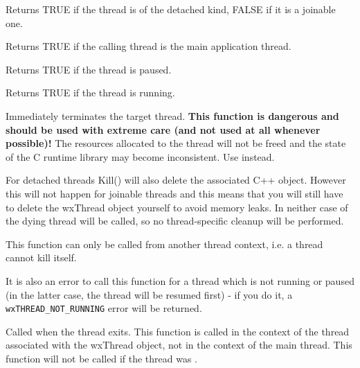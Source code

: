 
Returns TRUE if the thread is of the detached kind, FALSE if it is a joinable one.

\label{wxthreadismain}


Returns TRUE if the calling thread is the main application thread.

\label{wxthreadispaused}


Returns TRUE if the thread is paused.

\label{wxthreadisrunning}


Returns TRUE if the thread is running.

\label{wxthreadkill}


Immediately terminates the target thread. {\bf This function is dangerous and should
be used with extreme care (and not used at all whenever possible)!} The resources
allocated to the thread will not be freed and the state of the C runtime library
may become inconsistent. Use  instead.

For detached threads Kill() will also delete the associated C++ object.
However this will not happen for joinable threads and this means that you will
still have to delete the wxThread object yourself to avoid memory leaks.
In neither case  of the dying thread will be
called, so no thread-specific cleanup will be performed.

This function can only be called from another thread context, i.e. a thread
cannot kill itself.

It is also an error to call this function for a thread which is not running or
paused (in the latter case, the thread will be resumed first) - if you do it, 
a {\tt wxTHREAD\_NOT\_RUNNING} error will be returned.

\label{wxthreadonexit}


Called when the thread exits. This function is called in the context of the
thread associated with the wxThread object, not in the context of the main
thread. This function will not be called if the thread was 
.

